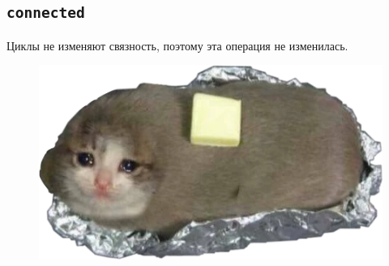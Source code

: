 \documentclass[11pt, a4paper]{article}
\begin{document}
\subsection{\texttt{connected}}
Циклы не изменяют связность, поэтому эта операция не изменилась.

\begin{figure}[h]
    \includegraphics[scale=0.35]{kot.png}
    \centering
\end{figure}
\end{document}
